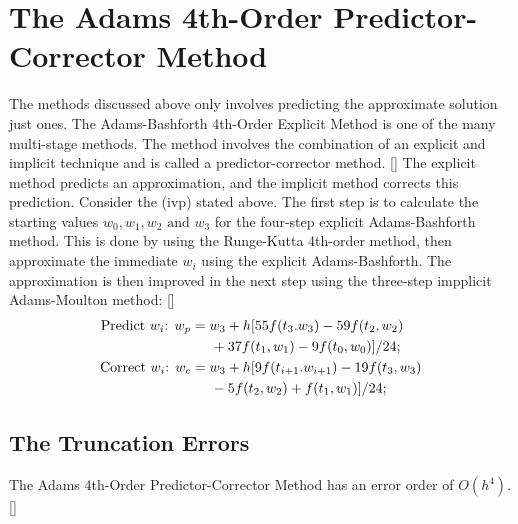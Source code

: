 \documentclass[12pt,oneside]{book}
\begin{document}
	\section{The Adams 4th-Order Predictor-Corrector Method} \label{m:ab4pc}
		\begin{spacing}{1.2}
			
			The methods discussed above only involves predicting the approximate solution just ones. The Adams-Bashforth 4th-Order Explicit Method is one of the many multi-stage methods. The method involves the combination of an explicit and implicit technique and is called a predictor-corrector method. [] The explicit method predicts an approximation, and the implicit method corrects this prediction. \newline
			Consider the (\ac{ivp}) stated above. The first step is to calculate the starting values $ w_{0}, w_{1}, w_{2} \text{ and } w_{3} $ for the four-step explicit Adams-Bashforth method. This is done by using the Runge-Kutta 4th-order method, then approximate the immediate $ w_{i} $  using the explicit Adams-Bashforth. The approximation is then improved in the next step using the three-step impplicit Adams-Moulton method: []
			\begin{equation}
				\begin{split}
					\text{Predict $ w_{i} $: } w_{p} & = w_{3} + h [ 55f(t_{3}. w_{3}) - 59f(t_{2}, w_{2}) \\
					& \hspace*{0.5cm} + 37f(t_{1}, w_{1}) - 9f(t_{0}, w_{0}) ] / 24; \\
					\text{Correct $ w_{i} $: } w_{c} & = w_{3} + h [ 9f(t_{i+1}. w_{i+1}) - 19f(t_{3}, w_{3}) \\
					& \hspace*{0.5cm} - 5f(t_{2}, w_{2}) + f(t_{1}, w_{1}) ] / 24;
				\end{split}
			\end{equation}
			
			\subsection*{The Truncation Errors}
			The Adams 4th-Order Predictor-Corrector Method has an error order of $ O(h^4) $. []	
			

\end{spacing}
\end{document}
